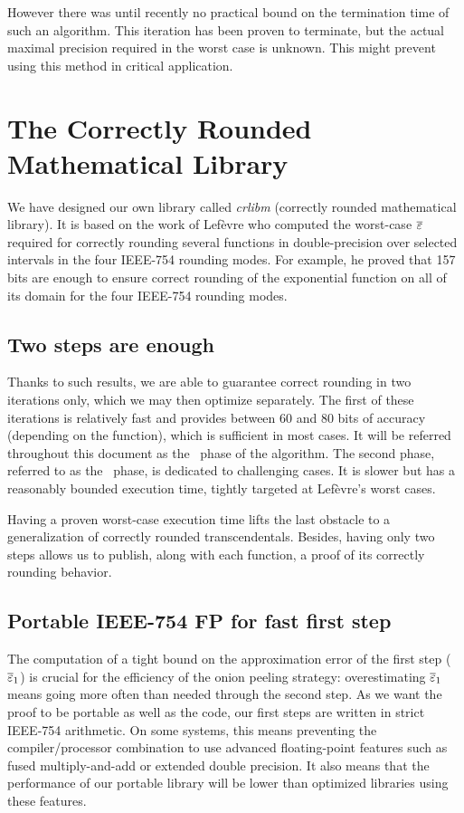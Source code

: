 However there was until recently no practical bound on the termination
time of such an algorithm. This iteration has been proven to
terminate, but the actual maximal precision required in the worst case
is unknown.  This might prevent using this method in critical
application.




\section{The Correctly Rounded Mathematical Library}
\label{section:crlibm}

We have designed our own library called \emph{crlibm} (correctly
rounded mathematical library). It is based on the work of
Lef\`evre\cite{LMT98,Lef2000} who computed the worst-case ${\overline{\varepsilon}}$
required for correctly rounding several functions in double-precision
over selected intervals in the four IEEE-754 rounding modes. For
example, he proved that 157 bits are enough to ensure correct rounding
of the exponential function on all of its domain for the four IEEE-754
rounding modes.

\subsection{Two steps are enough}
Thanks to such results, we are able to guarantee correct rounding in
two iterations only, which we may then optimize separately. The first
of these iterations is relatively fast and provides between 60 and 80
bits of accuracy (depending on the function), which is sufficient in
most cases. It will be referred throughout this document as the \quick\ 
phase of the algorithm. The second phase, referred to as the
\accurate\ phase, is dedicated to challenging cases. It is slower but
has a reasonably bounded execution time, tightly targeted at
Lef\`evre's worst cases.

Having a proven worst-case execution time lifts the last obstacle to a
generalization of correctly rounded transcendentals. Besides, having
only two steps allows us to publish, along with each function, a proof
of its correctly rounding behavior.


\subsection{Portable IEEE-754 FP for fast first step}
The computation of a tight bound on the approximation error of the
first step (${\overline{\varepsilon}}_1$) is crucial for the efficiency of the onion
peeling strategy: overestimating ${\overline{\varepsilon}}_1$ means going more often
than needed through the second step. As we want the proof to be
portable as well as the code, our first steps are written in strict
IEEE-754 arithmetic. On some systems, this means preventing the
compiler/processor combination to use advanced floating-point features
such as fused multiply-and-add or extended double precision. It also
means that the performance of our portable library will be lower than
optimized libraries using these features.

